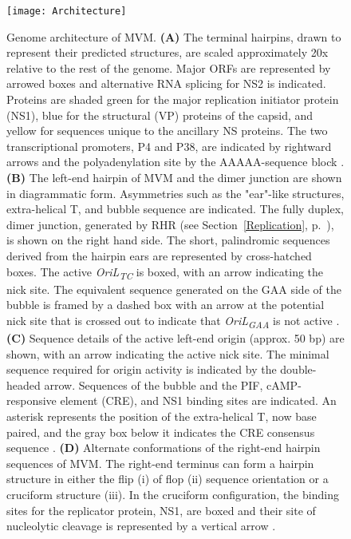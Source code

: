 \begin{figure}
\centering
  \texttt{[image: Architecture]}
  \caption[Genome architecture of minute virus of mice (MVM).]
   {Genome architecture of MVM. \textbf{(A)} The terminal hairpins, drawn to represent their predicted structures, are scaled approximately 20x relative to the rest of the genome. Major ORFs are represented by arrowed boxes and alternative RNA splicing for NS2 is indicated. Proteins are shaded green for the major replication initiator protein (NS1), blue for the structural (VP) proteins of the capsid, and yellow for sequences unique to the ancillary NS proteins. The two transcriptional promoters, P4 and P38, are indicated by rightward arrows and the polyadenylation site by the AAAAA-sequence block \cite{small}. \textbf{(B)} The left-end hairpin of MVM and the dimer junction are shown in diagrammatic form. Asymmetries such as the "ear"-like structures, extra-helical T, and bubble sequence are indicated. The fully duplex, dimer junction, generated by RHR (see Section~\ref{Replication}, p.~\pageref{Replication}), is shown on the right hand side. The short, palindromic sequences derived from the hairpin ears are represented by cross-hatched boxes. The active \textit{OriL\textsubscript{TC}} is boxed, with an arrow indicating the nick site. The equivalent sequence generated on the GAA side of the bubble is framed by a dashed box with an arrow at the potential nick site that is crossed out to indicate that \textit{OriL\textsubscript{GAA}} is not active \cite{pmid12885883, pmid16928767}. \textbf{(C)} Sequence details of the active left-end origin (approx. 50 bp) are shown, with an arrow indicating the active nick site. The minimal sequence required for origin activity is indicated by the double-headed arrow. Sequences of the bubble and the PIF, cAMP-responsive element (CRE), and NS1 binding sites are indicated. An asterisk represents the position of the extra-helical T, now base paired, and the gray box below it indicates the CRE consensus sequence \cite{pmid12885883}. \textbf{(D)} Alternate conformations of the right-end hairpin sequences of MVM. The right-end terminus can form a hairpin structure in either the flip (i) of flop (ii) sequence orientation or a cruciform structure (iii). In the cruciform configuration, the binding sites for the replicator protein, NS1, are boxed and their site of nucleolytic cleavage is represented by a vertical arrow \cite{pmid8614999}.
} 
\label{Architecture}
\end{figure}


